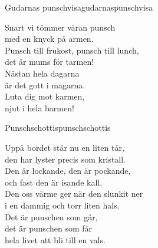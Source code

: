 \newpage

\begin{song}{Gudarnas punschvisa}{gudarnaspunschvisa}
\begin{vers}
Snart vi tömmer våran punsch\\
med en knyck på armen.\\
Punsch till frukost, punsch till lunch,\\
det är mums för tarmen!\\
Nästan hela dagarna\\
är det gott i magarna.\\
Luta dig mot karmen,\\
njut i hela barmen!\\
\end{vers}
\end{song}

\begin{song}{Punschschottis}{punschschottis}
\begin{vers}
Uppå bordet står nu en liten tår,\\
den har lyster precis som kristall.\\
Den är lockande, den är pockande,\\
och fast den är isande kall,\\
Den oss värme ger när den slunkit ner\\
i en dammig och torr liten hals.\\
Det är punschen som går,\\
det är punschen som får\\
hela livet att bli till en vals.\\
\end{vers}
\end{song}

\newpage

